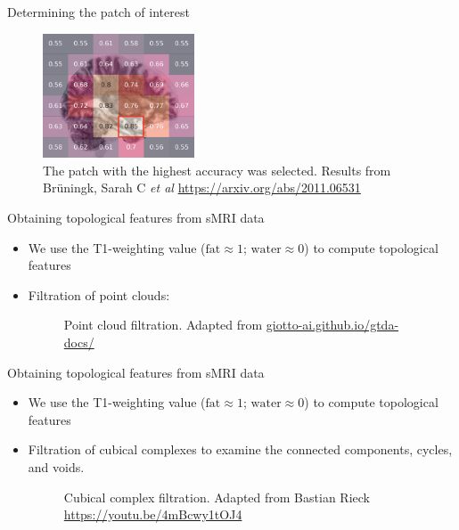\documentclass[aspectratio=169, 10pt, dvipsnames]{beamer}
\begin{document}
\begin{frame}[fragile]{Determining the patch of interest}
\begin{figure}
  \centering
  \includegraphics[width=0.4\textwidth]{figures/selected_patch.png}
  \caption{The patch with the highest accuracy was selected. Results from Br{\"u}ningk, Sarah C \textit{et al} \url{https://arxiv.org/abs/2011.06531}}
\end{figure}
\end{frame}

\begin{frame}[fragile]{Obtaining topological features from sMRI data}
  \begin{itemize}
  \item We use the T1-weighting value ($\text{fat}\approx 1$; $\text{water}\approx 0$) to compute
    topological features
  \item Filtration of point clouds:

    \begin{figure}
      \centering
      \caption{Point cloud filtration. Adapted from \url{giotto-ai.github.io/gtda-docs/}}
      \label{fig:pc_filt}
    \end{figure}
  \end{itemize}
\end{frame}

\begin{frame}[fragile]{Obtaining topological features from sMRI data}
  \begin{itemize}
  \item We use the T1-weighting value ($\text{fat}\approx 1$; $\text{water}\approx 0$) to compute topological features
  \item Filtration of cubical complexes to examine the connected components, cycles, and voids.
    \begin{figure}
      \centering
      \caption{Cubical complex filtration. Adapted from Bastian Rieck \url{https://youtu.be/4mBcwy1tOJ4}}
      \label{fig:pc_filt}
    \end{figure}
  \end{itemize}
\end{frame}
\end{document}
